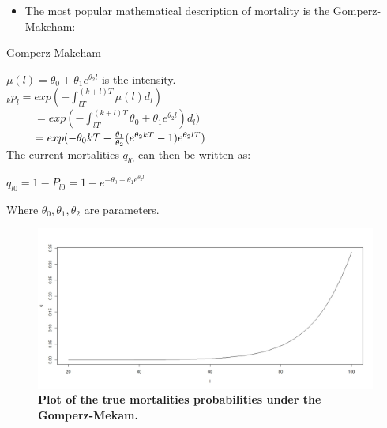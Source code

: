 \documentclass{beamer}
\begin{document}
\begin{frame}

\begin{itemize}
 \item The most popular mathematical description of mortality is the Gomperz-Makeham: \\
  \end{itemize}
  
\begin{block}{Gomperz-Makeham}
 
$ \mu (\textit{l}) = \theta_0 + \theta_1e^{\theta_2l} $ is the intensity.\\
$_kp_l = exp (-\int_{lT}^{(k+l)T}\mu (\textit{l})d_l) $\\
~~~~~$= exp(-\int_{lT}^{(k+l)T}\theta_0 + \theta_1e^{\theta_2l})d_l ) $\\
~~~~~$ = exp(- \theta_0 kT - {\theta_1 \over\theta_2}(e^{\theta_2kT}-1)e^{\theta_2lT})$ \\

The current mortalities  $q_{l0}$ can then be written as: 

$ q_{l0} =  1 - P_{l0} =1 - e ^{-\theta_0 - \theta_1e^{\theta_2l}}$
 
 Where $\theta_0, \theta_1, \theta_2$ are parameters.
 
 \end{block}
\end{frame}
\begin{frame}
\begin{figure}
  \centering
   \includegraphics[scale=0.2]{mort_proba_Gromp_Make.jpeg}
  \caption{\textbf{Plot of the true mortalities probabilities under the Gomperz-Mekam.}}
  
  \end{figure}

\end{frame}
\end{document}
